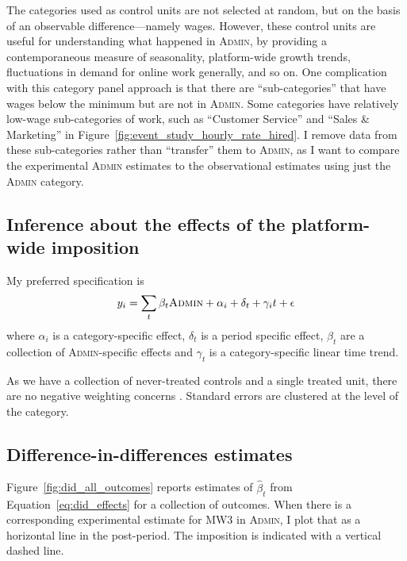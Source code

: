 \documentclass[AER]{AEA}
\newcommand{\admin}{\textsc{Admin}}
\begin{document}
The categories used as control units are not selected at random, but on the basis of an observable difference---namely wages. 
However, these control units are useful for understanding what happened in \admin{}, by providing a contemporaneous measure of seasonality, platform-wide growth trends, fluctuations in demand for online work generally, and so on. 
One complication with this category panel approach is that there are ``sub-categories'' that have wages below the minimum but are not in \admin{}.
Some categories have relatively low-wage sub-categories of work, such as ``Customer Service'' and ``Sales \& Marketing'' in Figure~\ref{fig:event_study_hourly_rate_hired}.
I remove data from these sub-categories rather than ``transfer'' them to \admin{}, as I want to compare the experimental \admin{} estimates to the observational estimates using just the \admin{} category. 

\subsection{Inference about the effects of the platform-wide imposition}
My preferred specification is 
\begin{align} \label{eq:did_effects}
  y_i = \sum_t \beta_t \textsc{Admin} + \alpha_i + \delta_t + \gamma_i t + \epsilon
\end{align}
where $\alpha_i$ is a category-specific effect, $\delta_t$ is a period specific effect, $\beta_t$ are a collection of \admin{}-specific effects and $\gamma_t$ is a category-specific linear time trend.

As we have a collection of never-treated controls and a single treated unit, there are no negative weighting concerns \citep{goodman2021difference}.
Standard errors are clustered at the level of the category.

\subsection{Difference-in-differences estimates}


Figure~\ref{fig:did_all_outcomes} reports estimates of $\hat{\beta}_t$ from Equation~\ref{eq:did_effects} for a collection of outcomes.
When there is a corresponding experimental estimate for MW3 in \admin{}, I plot that as a horizontal line in the post-period.
The imposition is indicated with a vertical dashed line.
\end{document}

